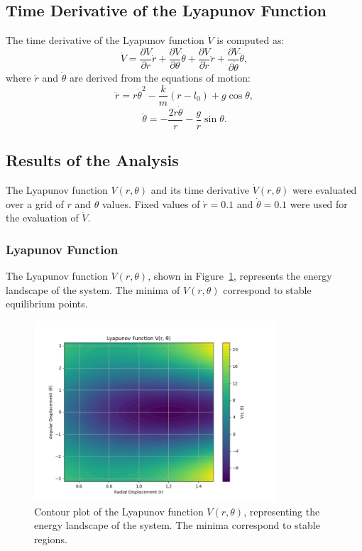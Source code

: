 \documentclass[12pt]{article}
\begin{document}
\subsection{Time Derivative of the Lyapunov Function}
The time derivative of the Lyapunov function \( \dot{V} \) is computed as:
\[
\dot{V} = \frac{\partial V}{\partial r} \dot{r} + \frac{\partial V}{\partial \theta} \dot{\theta} + \frac{\partial V}{\partial \dot{r}} \ddot{r} + \frac{\partial V}{\partial \dot{\theta}} \ddot{\theta},
\]
where \( \ddot{r} \) and \( \ddot{\theta} \) are derived from the equations of motion:
\[
\ddot{r} = r \dot{\theta}^2 - \frac{k}{m} (r - l_0) + g \cos\theta,
\]
\[
\ddot{\theta} = -\frac{2 \dot{r} \dot{\theta}}{r} - \frac{g}{r} \sin\theta.
\]

\subsection{Results of the Analysis}
The Lyapunov function \( V(r, \theta) \) and its time derivative \( \dot{V}(r, \theta) \) were evaluated over a grid of \( r \) and \( \theta \) values. Fixed values of \( \dot{r} = 0.1 \) and \( \dot{\theta} = 0.1 \) were used for the evaluation of \( \dot{V} \).

\subsubsection{Lyapunov Function}
The Lyapunov function \( V(r, \theta) \), shown in Figure~\ref{fig:lyapunov_function}, represents the energy landscape of the system. The minima of \( V(r, \theta) \) correspond to stable equilibrium points.

\begin{figure}[h!]
    \centering
    \includegraphics[width=0.8\textwidth]{lyapunov_function.png}
    \caption{Contour plot of the Lyapunov function \( V(r, \theta) \), representing the energy landscape of the system. The minima correspond to stable regions.}
    \label{fig:lyapunov_function}
\end{figure}
\end{document}
